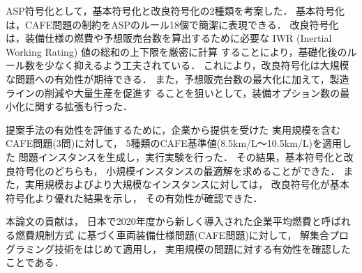 ASP符号化として，基本符号化と改良符号化の2種類を考案した．
基本符号化は，CAFE問題の制約をASPのルール18個で簡潔に表現できる．
改良符号化は，装備仕様の燃費や予想販売台数を算出するために必要な
IWR (Inertial Working Rating) 値の総和の上下限を厳密に計算
することにより，基礎化後のルール数を少なく抑えるよう工夫されている．
これにより，改良符号化は大規模な問題への有効性が期待できる．
また，予想販売台数の最大化に加えて，製造ラインの削減や大量生産を促進す
ることを狙いとして，装備オプション数の最小化に関する拡張も行った．

提案手法の有効性を評価するために，企業から提供を受けた
実用規模を含むCAFE問題(3問)に対して，
5種類のCAFE基準値(8.5km/L〜10.5km/L)を適用した
問題インスタンスを生成し，実行実験を行った．
その結果，基本符号化と改良符号化のどちらも，
小規模インスタンスの最適解を求めることができた．
また，実用規模およびより大規模なインスタンスに対しては，
改良符号化が基本符号化より優れた結果を示し，
その有効性が確認できた．

本論文の貢献は，
日本で2020年度から新しく導入された企業平均燃費と呼ばれる燃費規制方式
に基づく車両装備仕様問題(CAFE問題)に対して，
解集合プログラミング技術をはじめて適用し，
実用規模の問題に対する有効性を確認したことである．

